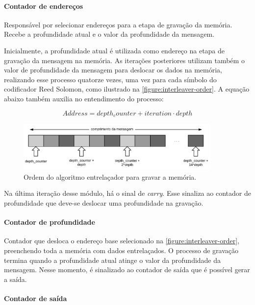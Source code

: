	\paragraph{Contador de endereços}
	Responsável por selecionar endereços para a etapa de gravação da memória. Recebe a profundidade atual e o valor da profundidade da mensagem.
	
	Inicialmente, a profundidade atual é utilizada como endereço na etapa de gravação da mensagem na memória. As iterações posteriores utilizam também o valor de profundidade da mensagem para deslocar os dados na memória, realizando esse processo quatorze vezes, uma vez para cada símbolo do codificador Reed Solomon, como ilustrado na \autoref{figure:interleaver-order}. A equação abaixo também auxilia no entendimento do processo:
	
	\begin{equation}
	Address = depth_counter + iteration \cdot depth
	\end{equation}
	
	\begin{figure}[h!]
		\caption{\label{figure:interleaver-order}Ordem do algoritmo entrelaçador para gravar a memória.}
		\centering
		\includegraphics[width=0.9\textwidth]{interleaver/order.pdf}
	\end{figure}
	
	Na última iteração desse módulo, há o sinal de \textit{carry}. Esse sinaliza ao contador de profundidade que deve-se deslocar uma profundidade na gravação.
	
	\paragraph{Contador de profundidade}
	Contador que desloca o endereço base selecionado na \autoref{figure:interleaver-order}, preenchendo toda a memória com dados entrelaçados. O processo de gravação termina quando a profundidade atual atinge o valor da profundidade da mensagem. Nesse momento, é sinalizado ao contador de saída que é possível gerar a saída.
	
	\paragraph{Contador de saída}
	
